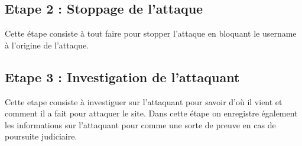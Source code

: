 \documentclass[11pt,a4paper]{book}
\begin{document}
\subsection{Etape 2 : Stoppage de l'attaque}
Cette étape consiste à tout faire pour stopper l'attaque en bloquant le username à l'origine de l'attaque.

\subsection{Etape 3 : Investigation de l'attaquant}
Cette etape consiste à investiguer sur l'attaquant pour savoir d'où il vient et comment il a fait pour attaquer le site.
Dans cette étape on enregistre également les informations sur l'attaquant pour comme une sorte de preuve en cas de poursuite judiciaire.
\end{document}
